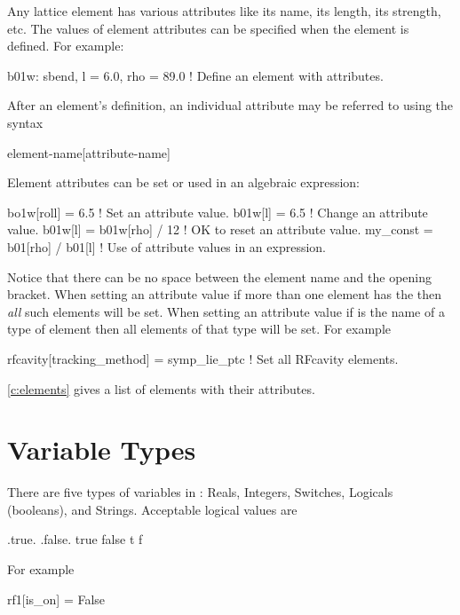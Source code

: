 Any lattice element has various attributes like its name, its length,
its strength, etc. The values of element attributes can be specified
when the element is defined. For example:
\begin{example}
  b01w: sbend, l = 6.0, rho = 89.0 ! Define an element with attributes.
\end{example}
After an element's definition, an individual attribute may be referred
to using the syntax
\begin{example}
  element-name[attribute-name]
\end{example}
Element attributes can be set or used in an algebraic expression:
\begin{example}
  bo1w[roll] = 6.5                  ! Set an attribute value.
  b01w[l] = 6.5                     ! Change an attribute value.
  b01w[l] = b01w[rho] / 12          ! OK to reset an attribute value.
  my_const = b01[rho] / b01[l]      ! Use of attribute values in an expression.
\end{example}
Notice that there can be no space between the element name and the
\vn{[} opening bracket.  When setting an attribute value if more than
one element has the  then {\it all} such elements
will be set.  When setting an attribute value if  is
the name of a type of element then all elements of that type will be
set. For example
\begin{example}
  rfcavity[tracking_method] = symp_lie_ptc ! Set all RFcavity elements.
\end{example}

\cref{c:elements} gives a list of elements with their attributes.

\section{Variable Types}
\label{s:var_types}

There are five types of variables in \bmad: Reals, Integers, Switches,
Logicals (booleans), and Strings. Acceptable logical values are
\begin{example}
  .true.  .false.
   true    false
   t       f
\end{example}
For example
\begin{example}
  rf1[is_on] = False
\end{example}

